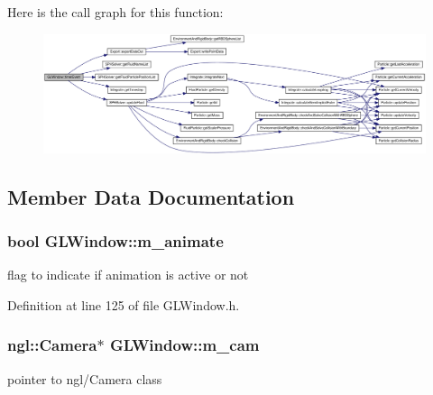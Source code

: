 Here is the call graph for this function:\nopagebreak
\begin{figure}[H]
\begin{center}
\leavevmode
\includegraphics[width=420pt]{class_g_l_window_a8901509418ab117e8613d624df9b5666_cgraph}
\end{center}
\end{figure}




\subsection{Member Data Documentation}
\hypertarget{class_g_l_window_a1d74b588450b6719a4b1446ad47927dc}{
\subsubsection[{m\_\-animate}]{\setlength{\rightskip}{0pt plus 5cm}bool {\bf GLWindow::m\_\-animate}}}
\label{class_g_l_window_a1d74b588450b6719a4b1446ad47927dc}


flag to indicate if animation is active or not 



Definition at line 125 of file GLWindow.h.

\hypertarget{class_g_l_window_a55556dafb4fc86c35b270ca0d68f456e}{
\subsubsection[{m\_\-cam}]{\setlength{\rightskip}{0pt plus 5cm}ngl::Camera$\ast$ {\bf GLWindow::m\_\-cam}}}
\label{class_g_l_window_a55556dafb4fc86c35b270ca0d68f456e}


pointer to ngl/Camera class 



